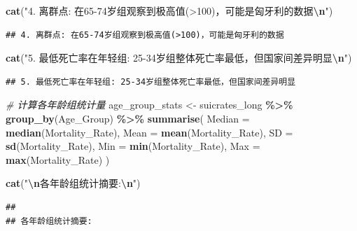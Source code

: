 \documentclass[
]{article}
\newenvironment{Shaded}{\begin{snugshade}}{\end{snugshade}}
\newcommand{\AttributeTok}[1]{\textcolor[rgb]{0.13,0.29,0.53}{#1}}
\newcommand{\CommentTok}[1]{\textcolor[rgb]{0.56,0.35,0.01}{\textit{#1}}}
\newcommand{\FunctionTok}[1]{\textcolor[rgb]{0.13,0.29,0.53}{\textbf{#1}}}
\newcommand{\NormalTok}[1]{#1}
\newcommand{\OtherTok}[1]{\textcolor[rgb]{0.56,0.35,0.01}{#1}}
\newcommand{\SpecialCharTok}[1]{\textcolor[rgb]{0.81,0.36,0.00}{\textbf{#1}}}
\newcommand{\StringTok}[1]{\textcolor[rgb]{0.31,0.60,0.02}{#1}}
\begin{document}
\begin{Shaded}
\begin{Highlighting}[]
\FunctionTok{cat}\NormalTok{(}\StringTok{"4. 离群点: 在65{-}74岁组观察到极高值(\textgreater{}100)，可能是匈牙利的数据}\SpecialCharTok{\textbackslash{}n}\StringTok{"}\NormalTok{)}
\end{Highlighting}
\end{Shaded}

\begin{verbatim}
## 4. 离群点: 在65-74岁组观察到极高值(>100)，可能是匈牙利的数据
\end{verbatim}

\begin{Shaded}
\begin{Highlighting}[]
\FunctionTok{cat}\NormalTok{(}\StringTok{"5. 最低死亡率在年轻组: 25{-}34岁组整体死亡率最低，但国家间差异明显}\SpecialCharTok{\textbackslash{}n}\StringTok{"}\NormalTok{)}
\end{Highlighting}
\end{Shaded}

\begin{verbatim}
## 5. 最低死亡率在年轻组: 25-34岁组整体死亡率最低，但国家间差异明显
\end{verbatim}

\begin{Shaded}
\begin{Highlighting}[]
\CommentTok{\# 计算各年龄组统计量}
\NormalTok{age\_group\_stats }\OtherTok{\textless{}{-}}\NormalTok{ suicrates\_long }\SpecialCharTok{\%\textgreater{}\%}
  \FunctionTok{group\_by}\NormalTok{(Age\_Group) }\SpecialCharTok{\%\textgreater{}\%}
  \FunctionTok{summarise}\NormalTok{(}
    \AttributeTok{Median =} \FunctionTok{median}\NormalTok{(Mortality\_Rate),}
    \AttributeTok{Mean =} \FunctionTok{mean}\NormalTok{(Mortality\_Rate),}
    \AttributeTok{SD =} \FunctionTok{sd}\NormalTok{(Mortality\_Rate),}
    \AttributeTok{Min =} \FunctionTok{min}\NormalTok{(Mortality\_Rate),}
    \AttributeTok{Max =} \FunctionTok{max}\NormalTok{(Mortality\_Rate)}
\NormalTok{  )}

\FunctionTok{cat}\NormalTok{(}\StringTok{"}\SpecialCharTok{\textbackslash{}n}\StringTok{各年龄组统计摘要:}\SpecialCharTok{\textbackslash{}n}\StringTok{"}\NormalTok{)}
\end{Highlighting}
\end{Shaded}

\begin{verbatim}
## 
## 各年龄组统计摘要:
\end{verbatim}
\end{document}

